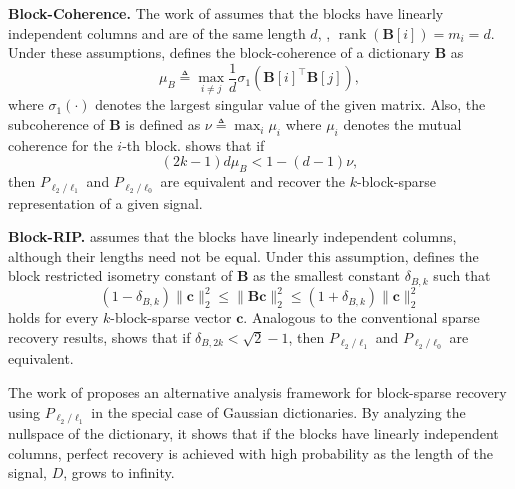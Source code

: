 \documentclass[10pt,twocolumn,twoside] {IEEEtran}
\begin{document}
{\medskip\noindent\textbf{{Block-Coherence}.} } The work of \cite{Eldar:TSP10} assumes that the blocks have linearly independent columns and are of the same length $d$,
{}, ${\operatorname{rank}}({\boldsymbol{B}}[i]) = m_i = d$. Under these assumptions, \cite{Eldar:TSP10} defines the block-coherence of a dictionary ${\boldsymbol{B}}$ as 
\begin{equation}
\label{eq:block-coh}
\mu_{B} \triangleq \max_{i \neq j} \frac{1}{d} \sigma_1({\boldsymbol{B}}[i]^{\top}{\boldsymbol{B}}[j]),
\end{equation}
where $\sigma_1(\cdot)$ denotes the largest singular value of the given matrix. Also, the subcoherence of ${\boldsymbol{B}}$ is defined as $\nu \triangleq \max_{i}{\mu_i}$ where $\mu_i$ denotes the mutual coherence for the $i$-th block. \cite{Eldar:TSP10} shows that if 
\begin{equation}
\label{eq:block-coh-cond}
(2k-1) d \mu_{B} < 1 - (d-1) \nu,
\end{equation}
then $P_{\ell_2/\ell_1}$ and $P_{\ell_2/\ell_0}$ are equivalent and recover the $k$-block-sparse representation of a given signal. 

{\medskip\noindent\textbf{{Block-RIP}.} }  \cite{Eldar:TIT09} assumes that the blocks have linearly independent columns, although their lengths need not be equal. Under this assumption, \cite{Eldar:TIT09} defines the block restricted isometry constant of ${\boldsymbol{B}}$ as the smallest constant $\delta_{B,k}$ such that
\begin{equation}
\label{eq:block-RIP}
(1 - \delta_{B,k}) \| {\boldsymbol{c}} \|_2^2 \leq \| {\boldsymbol{B}} {\boldsymbol{c}} \|_2^2 \leq (1 + \delta_{B,k}) \| {\boldsymbol{c}} \|_2^2
\end{equation}
holds for every $k$-block-sparse vector ${\boldsymbol{c}}$. Analogous to the conventional sparse recovery results, \cite{Eldar:TIT09} shows that if $\delta_{B,2k} < \sqrt{2} - 1$, then $P_{\ell_2/\ell_1}$ and $P_{\ell_2/\ell_0}$ are equivalent. 

The work of \cite{Stojnic:TSP09} proposes an alternative analysis framework for block-sparse recovery using $P_{\ell_2/\ell_1}$ in the special case of Gaussian dictionaries. By analyzing the nullspace of the dictionary, it shows that if the blocks have linearly independent columns, perfect recovery is achieved with high probability as the length of the signal, $D$, grows to infinity. 
\end{document}
